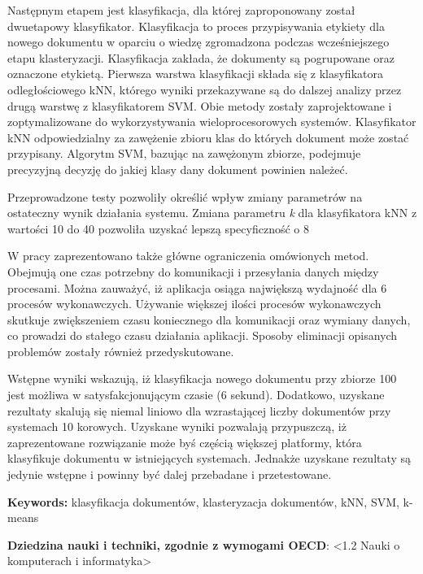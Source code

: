 Następnym etapem jest klasyfikacja, dla której zaproponowany został dwuetapowy klasyfikator. Klasyfikacja to proces przypisywania etykiety dla nowego dokumentu w oparciu o wiedzę zgromadzona podczas wcześniejszego etapu klasteryzacji. Klasyfikacja zakłada, że dokumenty są pogrupowane oraz oznaczone etykietą. Pierwsza warstwa klasyfikacji składa się z klasyfikatora odległościowego kNN, którego wyniki przekazywane są do dalszej analizy przez drugą warstwę z klasyfikatorem SVM. Obie metody zostały zaprojektowane i zoptymalizowane do wykorzystywania wieloprocesorowych systemów. Klasyfikator kNN odpowiedzialny za zawężenie zbioru klas do których dokument może zostać przypisany. Algorytm SVM, bazując na zawężonym zbiorze, podejmuje precyzyjną decyzję do jakiej klasy dany dokument powinien należeć.

Przeprowadzone testy pozwoliły określić wpływ zmiany parametrów na ostateczny wynik działania systemu. Zmiana parametru \textit{k} dla klasyfikatora kNN z wartości 10 do 40 pozwoliła uzyskać lepszą specyficzność o 8%

W pracy zaprezentowano także główne ograniczenia omówionych metod. Obejmują one czas potrzebny do komunikacji i przesyłania danych między procesami. Można zauważyć, iż aplikacja osiąga największą wydajność dla 6 procesów wykonawczych. Używanie większej ilości procesów wykonawczych skutkuje zwiększeniem czasu koniecznego dla komunikacji oraz wymiany danych, co prowadzi do stałego czasu działania aplikacji. Sposoby eliminacji opisanych problemów zostały również przedyskutowane.

Wstępne wyniki wskazują, iż klasyfikacja nowego dokumentu przy zbiorze 100 jest możliwa w satysfakcjonującym czasie (6 sekund). Dodatkowo, uzyskane rezultaty skalują się niemal liniowo dla wzrastającej liczby dokumentów przy systemach 10 korowych. Uzyskane wyniki pozwalają przypuszczą, iż zaprezentowane rozwiązanie może byś częścią większej platformy, która klasyfikuje dokumentu w istniejących systemach. Jednakże uzyskane rezultaty są jedynie wstępne i powinny być dalej przebadane i przetestowane.


\vspace{12pt}
\noindent\textbf{Keywords:} klasyfikacja dokumentów, klasteryzacja dokumentów, kNN, SVM, k-means

\vspace{12pt} \noindent\textbf{Dziedzina nauki i techniki, zgodnie z wymogami
	OECD}: \textless{}1.2 Nauki o komputerach i informatyka\textgreater{}